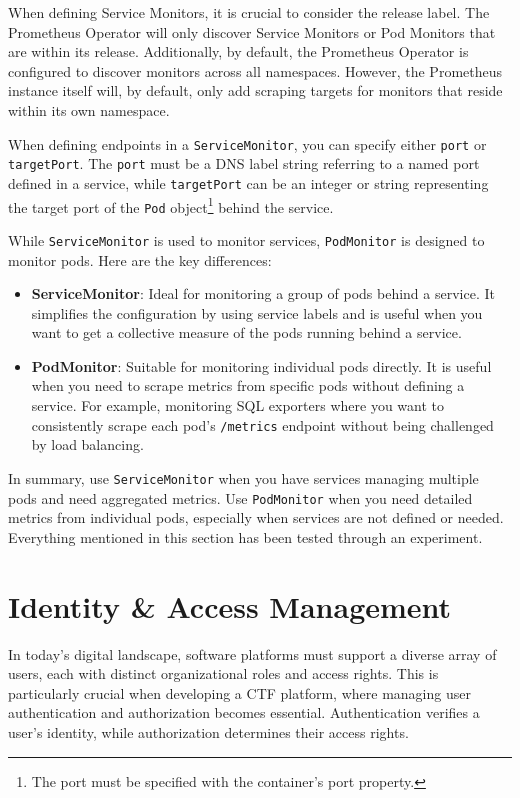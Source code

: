 When defining Service Monitors, it is crucial to consider the release label. The Prometheus Operator will only discover Service Monitors or Pod Monitors that are within its release. Additionally, by default, the Prometheus Operator is configured to discover monitors across all namespaces. However, the Prometheus instance itself will, by default, only add scraping targets for monitors that reside within its own namespace.

When defining endpoints in a \texttt{ServiceMonitor}, you can specify either \texttt{port} or \texttt{targetPort}. The \texttt{port} must be a DNS label string referring to a named port defined in a service, while \texttt{targetPort} can be an integer or string representing the target port of the \texttt{Pod} object\footnote{The port must be specified with the container's port property.} behind the service.

While \texttt{ServiceMonitor} is used to monitor services, \texttt{PodMonitor} is designed to monitor pods. Here are the key differences:

\begin{itemize}
    \item \textbf{ServiceMonitor}: Ideal for monitoring a group of pods behind a service. It simplifies the configuration by using service labels and is useful when you want to get a collective measure of the pods running behind a service.
    \item \textbf{PodMonitor}: Suitable for monitoring individual pods directly. It is useful when you need to scrape metrics from specific pods without defining a service. For example, monitoring SQL exporters where you want to consistently scrape each pod's \texttt{/metrics} endpoint without being challenged by load balancing.
\end{itemize}

In summary, use \texttt{ServiceMonitor} when you have services managing multiple pods and need aggregated metrics. Use \texttt{PodMonitor} when you need detailed metrics from individual pods, especially when services are not defined or needed. Everything mentioned in this section has been tested through an experiment.

\chapter{Identity \& Access Management}
In today's digital landscape, software platforms must support a diverse array of users, each with distinct organizational roles and access rights. This is particularly crucial when developing a CTF platform, where managing user authentication and authorization becomes essential. Authentication verifies a user's identity, while authorization determines their access rights.

